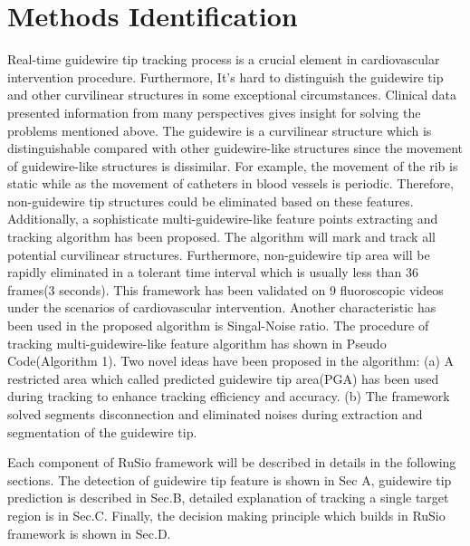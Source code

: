 \documentclass[journal]{IEEEtran}
\begin{document}
\section{Methods Identification}
Real-time guidewire tip tracking process is a crucial element in cardiovascular intervention procedure. Furthermore, It's hard to distinguish the guidewire tip and other curvilinear structures in some exceptional circumstances. Clinical data presented information from many perspectives gives insight for solving the problems mentioned above. The guidewire is a curvilinear structure which is distinguishable compared with other guidewire-like structures since the movement of guidewire-like structures is dissimilar. For example, the movement of the rib is static while as the movement of catheters in blood vessels is periodic. Therefore, non-guidewire tip structures could be eliminated based on these features. Additionally, a sophisticate multi-guidewire-like feature points extracting and tracking algorithm has been proposed. The algorithm will mark and track all potential curvilinear structures. Furthermore, non-guidewire tip area will be rapidly eliminated in a tolerant time interval which is usually less than 36 frames(3 seconds). This framework has been validated on 9 fluoroscopic videos under the scenarios of cardiovascular intervention. Another characteristic has been used in the proposed algorithm is Singal-Noise ratio. The procedure of tracking multi-guidewire-like feature algorithm has shown in Pseudo Code(Algorithm 1). Two novel ideas have been proposed in the algorithm: (a) A restricted area which called predicted guidewire tip area(PGA) has been used during tracking to enhance tracking efficiency and accuracy. (b) The framework solved segments disconnection and eliminated noises during extraction and segmentation of the guidewire tip.
\par
Each component of RuSio framework will be described in details in the following sections. The detection of guidewire tip feature is shown in Sec A, guidewire tip prediction is described in Sec.B, detailed explanation of tracking a single target region is in Sec.C. Finally, the decision making principle which builds in RuSio framework is shown in Sec.D.
\end{document}

